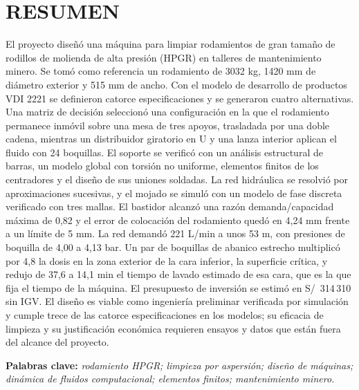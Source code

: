 \chapter*{RESUMEN}

El proyecto diseñó una máquina para limpiar rodamientos de gran tamaño de rodillos de molienda de alta presión (HPGR) en talleres de mantenimiento minero. Se tomó como referencia un rodamiento de 3032 kg, 1420 mm de diámetro exterior y 515 mm de ancho. Con el modelo de desarrollo de productos VDI 2221 se definieron catorce especificaciones y se generaron cuatro alternativas. Una matriz de decisión seleccionó una configuración en la que el rodamiento permanece inmóvil sobre una mesa de tres apoyos, trasladada por una doble cadena, mientras un distribuidor giratorio en U y una lanza interior aplican el fluido con 24 boquillas. El soporte se verificó con un análisis estructural de barras, un modelo global con torsión no uniforme, elementos finitos de los centradores y el diseño de sus uniones soldadas. La red hidráulica se resolvió por aproximaciones sucesivas, y el mojado se simuló con un modelo de fase discreta verificado con tres mallas. El bastidor alcanzó una razón demanda/capacidad máxima de 0,82 y el error de colocación del rodamiento quedó en 4,24 mm frente a un límite de 5 mm. La red demandó 221 L/min a unos 53 m, con presiones de boquilla de 4,00 a 4,13 bar. Un par de boquillas de abanico estrecho multiplicó por 4,8 la dosis en la zona exterior de la cara inferior, la superficie crítica, y redujo de 37,6 a 14,1 min el tiempo de lavado estimado de esa cara, que es la que fija el tiempo de la máquina. El presupuesto de inversión se estimó en S/~314\,310 sin IGV. El diseño es viable como ingeniería preliminar verificada por simulación y cumple trece de las catorce especificaciones en los modelos; su eficacia de limpieza y su justificación económica requieren ensayos y datos que están fuera del alcance del proyecto.

\medskip
\noindent\textbf{Palabras clave:} \textit{rodamiento HPGR; limpieza por aspersión; diseño de máquinas; dinámica de fluidos computacional; elementos finitos; mantenimiento minero.}
